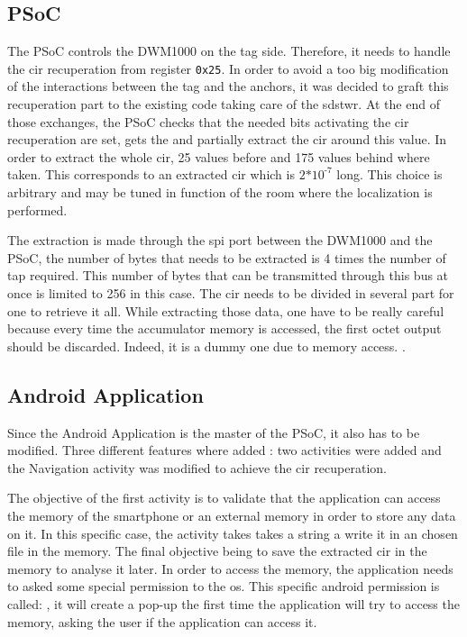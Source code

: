 \subsection{PSoC}

The PSoC controls the DWM1000 on the tag side. Therefore, it needs to handle the \gls{cir} recuperation from register \texttt{0x25}. In order to avoid a too big modification of the interactions between the tag and the anchors, it was decided to graft this recuperation part to the existing code taking care of the \gls{sdstwr}. At the end of those exchanges, the PSoC checks that the needed bits activating the \gls{cir} recuperation are set, gets the  and partially extract the \gls{cir} around this value. In order to extract the whole \gls{cir}, 25 values before and 175 values behind where taken. This corresponds to an extracted \gls{cir} which is $\text{2*10}^\text{-7}$  long. This choice is arbitrary and may be tuned in function of the room where the localization is performed.
\vspace{2mm}

The extraction is made through the \gls{spi} port between the DWM1000 and the PSoC, the number of bytes that needs to be extracted is 4 times the number of tap required. This number of bytes that can be transmitted through this bus at once is limited to 256 in this case. The \gls{cir} needs to be divided in several part for one to retrieve it all. While extracting those data, one have to be really careful because every time the accumulator memory is accessed, the first octet output should be discarded. Indeed, it is a dummy one due to memory access. \cite{usermanual}.

\subsection{Android Application}

Since the Android Application is the master of the PSoC, it also has to be modified. Three different features where added : two activities were added and the Navigation activity was modified to achieve the \gls{cir} recuperation. 
\vspace{2mm}

The objective of the first activity is to validate that the application can access the memory of the smartphone or an external memory in order to store any data on it. In this specific case, the activity takes takes a string a write it in an chosen file in the memory. The final objective being to save the extracted \gls{cir} in the memory to analyse it later. In order to access the memory, the application needs to asked some special permission to the \gls{os}. This specific android permission is called: , it will create a pop-up the first time the application will try to access the memory, asking the user if the application can access it.
\vspace{2mm}

